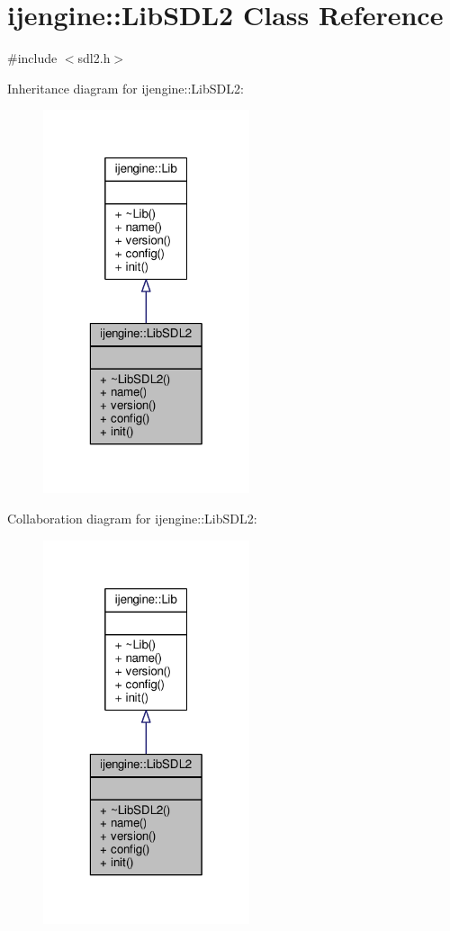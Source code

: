\hypertarget{classijengine_1_1LibSDL2}{\section{ijengine\-:\-:Lib\-S\-D\-L2 Class Reference}
\label{classijengine_1_1LibSDL2}
}


{\ttfamily \#include $<$sdl2.\-h$>$}



Inheritance diagram for ijengine\-:\-:Lib\-S\-D\-L2\-:\nopagebreak
\begin{figure}[H]
\begin{center}
\leavevmode
\includegraphics[width=172pt]{classijengine_1_1LibSDL2__inherit__graph}
\end{center}
\end{figure}


Collaboration diagram for ijengine\-:\-:Lib\-S\-D\-L2\-:\nopagebreak
\begin{figure}[H]
\begin{center}
\leavevmode
\includegraphics[width=172pt]{classijengine_1_1LibSDL2__coll__graph}
\end{center}
\end{figure}
